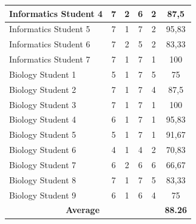 \documentclass[conference,a4paper]{IEEEtran}
\begin{document}
\begin{table}[htbp]
{\begin{tabular}{|l|c|c|c|c|c|}
      Informatics Student 4                  & 7                                             & 2                                     & 6          & 2          & 87,5  \\ \hline
      Informatics Student 5                  & 7                                             & 1                                     & 7          & 2          & 95,83 \\ \hline
      Informatics Student 6                  & 7                                             & 2                                     & 5          & 2          & 83,33 \\ \hline
      Informatics Student 7                  & 7                                             & 1                                     & 7          & 1          & 100   \\ \hline
      Biology Student 1                      & 5                                             & 1                                     & 7          & 5          & 75    \\ \hline
      Biology Student 2                      & 7                                             & 1                                     & 7          & 4          & 87,5  \\ \hline
      Biology Student 3                      & 7                                             & 1                                     & 7          & 1          & 100   \\ \hline
      Biology Student 4                      & 6                                             & 1                                     & 7          & 1          & 95,83 \\ \hline
      Biology Student 5                      & 5                                             & 1                                     & 7          & 1          & 91,67 \\ \hline
      Biology Student 6                      & 4                                             & 1                                     & 4          & 2          & 70,83 \\ \hline
      Biology Student 7                      & 6                                             & 2                                     & 6          & 6          & 66,67 \\ \hline
      Biology Student 8                      & 7                                             & 1                                     & 7          & 5          & 83,33 \\ \hline
      Biology Student 9                      & 6                                             & 1                                     & 6          & 4          & 75    \\ \hline

      \multicolumn{5}{|c|}{\textbf{Average}} & \textbf{88.26}                                                                                                          \\ \hline
    \end{tabular}%
  }
\end{table}
\end{document}
